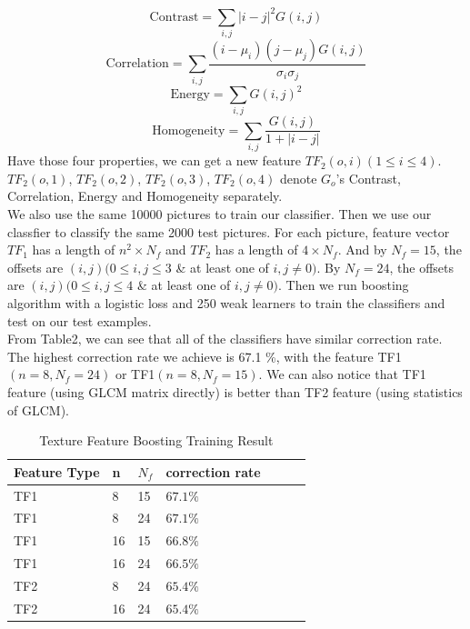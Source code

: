 \documentclass[12pt]{article}
\begin{document}
$$ \mathrm{Contrast} = \sum_{i,j}|i-j|^2 G(i,j) $$
$$ \mathrm{Correlation} = \sum_{i,j}\frac{(i - \mu_i)(j - \mu_j)G(i,j)}{\sigma_i \sigma_j} $$
$$ \mathrm{Energy} = \sum_{i,j}G(i,j)^2 $$
$$ \mathrm{Homogeneity} = \sum_{i,j} \frac{G(i,j)}{1 + |i-j|} $$
Have those four properties, we can get a new feature $TF_2(o, i) (1 \leq i \leq 4)$. $TF_2(o, 1)$, $TF_2(o,2)$, $TF_2(o,3)$, $TF_2(o,4)$ denote $G_o$'s Contrast, Correlation, Energy and Homogeneity separately.\\
We also use the same 10000 pictures to train our classifier. Then we use our classfier to classify the same 2000 test pictures. For each picture, feature vector $TF_1$ has a length of $n^2 \times N_f$ and $TF_2$ has a length of $4 \times N_f$. And by $N_f =15$, the offsets are $(i,j) (0 \leq i, j \leq 3$ \& at least one of $i,j \neq 0)$. By $N_f = 24$, the offsets are $(i,j) (0 \leq i, j \leq 4$ \& at least one of $i,j \neq 0)$. Then we run boosting algorithm with a logistic loss and 250 weak learners to train the classifiers and test on our test examples.\\
From Table2, we can see that all of the classifiers have similar correction rate. The highest correction rate we achieve is 67.1 \%, with the feature TF1$(n =8 ,N_f = 24)$ or TF1$(n =8 ,N_f = 15)$. We can also notice that TF1 feature (using GLCM matrix directly) is better than TF2 feature (using statistics of GLCM).

\begin{table}[h]
\caption{Texture Feature Boosting Training Result}
\centering
\begin{tabular}{| l | l | l | l | l | l | l |}
\hline
Feature Type & n & $N_f$ & correction rate\\
\hline
TF1 & 8 & 15 & $67.1 \%$\\
\hline
TF1 & 8 & 24 & $67.1 \%$\\
\hline
TF1 & 16 & 15 & $66.8 \%$\\
\hline
TF1 & 16 & 24 & $66.5 \%$\\
\hline
TF2 & 8 & 24 & $65.4 \%$\\
\hline
TF2 & 16 & 24 & $65.4 \%$\\
\hline
\end{tabular}
\end{table}
\end{document}
